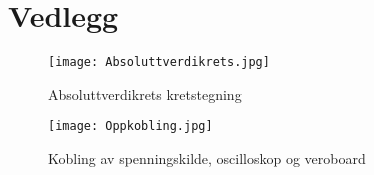
\section*{Vedlegg}

\begin{figure}[h]
  \texttt{[image: Absoluttverdikrets.jpg]}
  \caption{Absoluttverdikrets kretstegning}
  \label{Kretstegning:1}
\end{figure}

\begin{figure}[h]
  \texttt{[image: Oppkobling.jpg]}
  \caption{Kobling av spenningskilde, oscilloskop og veroboard}
  \label{Kobling:1}
\end{figure}
